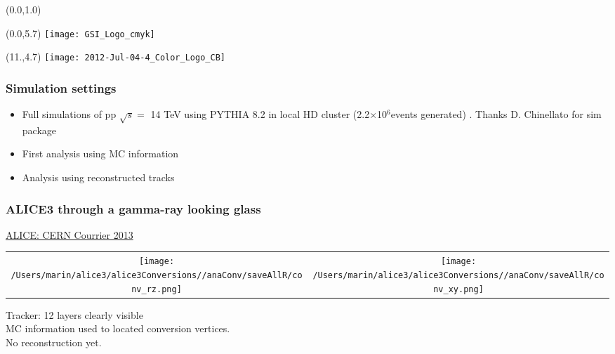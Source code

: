 \documentclass[final,hyperref={pdfpagelabels=false},aspectratio=169,t]{beamer}
\date{\today} %
\title{\texorpdfstring{\LARGE Photon Identification. Barrel conversions }}
\author[A.Marin]{Ana Marin}
\institute[GSI]{\small GSI, Darmstadt, Germany}
\begin{document}
\begin{frame}

  \begin{textblock}{14}(0.0,1.0)
    \titlepage
  \end{textblock}
  

 \begin{textblock}{12}(0.0,5.7)
     \texttt{[image: GSI\_Logo\_cmyk]}
\end{textblock}

  \begin{textblock}{12}(11.,4.7)
    \texttt{[image: 2012-Jul-04-4\_Color\_Logo\_CB]}
  \end{textblock}

\end{frame}



\begin{frame}
\frametitle{Simulation settings}

\begin{itemize}
\item  Full simulations of pp $\sqrt{s} =$ 14 TeV using PYTHIA 8.2  in local HD cluster  (2.2$\times$10$^6$events generated) . Thanks D. Chinellato for sim package
\item  First analysis using MC information  
\item  Analysis using reconstructed tracks
\end{itemize}
\end{frame}

\begin{frame}
\frametitle{ALICE3 through a gamma-ray looking glass}
\vspace*{-0.4cm}
{\tiny
\href{https://cerncourier.com/a/alice-through-a-gamma-ray-looking-glass/}{\color{violet} ALICE: CERN Courrier 2013} 
}
\vspace*{0.4cm}

\begin{tabular}{cc}
\texttt{[image: /Users/marin/alice3/alice3Conversions//anaConv/saveAllR/conv\_rz.png]}&
\texttt{[image: /Users/marin/alice3/alice3Conversions//anaConv/saveAllR/conv\_xy.png]}\\
\end{tabular}

Tracker: 12 layers clearly visible\\
MC information used to located conversion vertices. \\
No reconstruction yet.

\end{frame}
\end{document}
